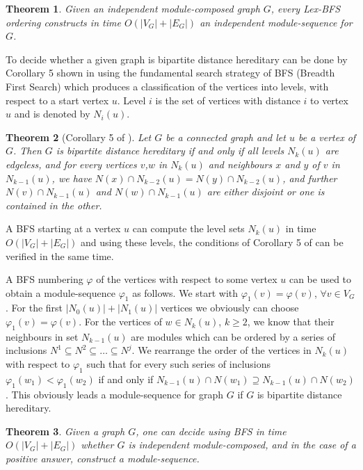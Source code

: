 \documentclass[11pt]{article}
\newtheorem{theorem}{Theorem}[section]
\begin{document}
\begin{theorem}
Given an independent module-composed graph $G$, every  Lex-BFS ordering  
constructs in  time $O(|V_G|+|E_G|)$ an independent module-sequence for $G$.
\end{theorem}



To decide whether a given graph is bipartite distance hereditary can be
done by Corollary 5 shown in \cite{BM86} using the fundamental search strategy 
of BFS (Breadth First Search) which produces a classification of the vertices into levels, 
with respect to a start vertex $u$. Level $i$ is the set of vertices
with distance $i$ to vertex $u$ and is denoted by $N_i(u)$.



\begin{theorem}[Corollary 5 of \cite{BM86}]
Let $G$ be a connected graph and let $u$ be a vertex of $G$. Then $G$
is bipartite distance hereditary if and only if all levels $N_k(u)$
are edgeless, and for every vertices $v$,$w$ in $N_k(u)$ and neighbours
$x$ and $y$ of $v$ in $N_{k-1}(u)$, we have $N(x)\cap N_{k-2}(u)=N(y)\cap N_{k-2}(u)$,
and further $N(v)\cap N_{k-1}(u)$ and $N(w)\cap N_{k-1}(u)$ are either disjoint
or one is contained in the other.
\end{theorem}



A BFS starting at a vertex $u$ can compute the level sets $N_k(u)$ 
in time $O(|V_G|+|E_G|)$ and using these levels,
the conditions of Corollary 5 of \cite{BM86} can be verified in the same time.

A BFS numbering $\varphi$ of the vertices with respect to some
vertex $u$ can be used to obtain a
module-sequence $\varphi_1$ as follows. We start with $\varphi_1(v)=\varphi(v)$, $\forall v\in V_G$.
For the first $|N_0(u)|+|N_1(u)|$ vertices we obviously 
can choose $\varphi_1(v)=\varphi(v)$. For the vertices of $w\in N_k(u)$, $k\ge 2$,
we know that their neighbours in set $N_{k-1}(u)$ are modules which can be ordered
by a series of inclusions $N^1\subseteq N^2 \subseteq \ldots \subseteq N^j$. We rearrange the order of 
the vertices in $N_k(u)$ with respect to $\varphi_1$ such that for every such series of inclusions 
$\varphi_1(w_1)<\varphi_1(w_2)$ if and only if $N_{k-1}(u)\cap N(w_1)\supseteq N_{k-1}(u)\cap N(w_2)$.
This obviously leads a module-sequence for graph $G$ if $G$ is bipartite distance hereditary.




\begin{theorem}
Given a graph $G$, one can decide using  BFS in time $O(|V_G|+|E_G|)$ whether
$G$ is independent module-composed, and in the case of a positive answer, 
construct a module-sequence.
\end{theorem}
\end{document}
